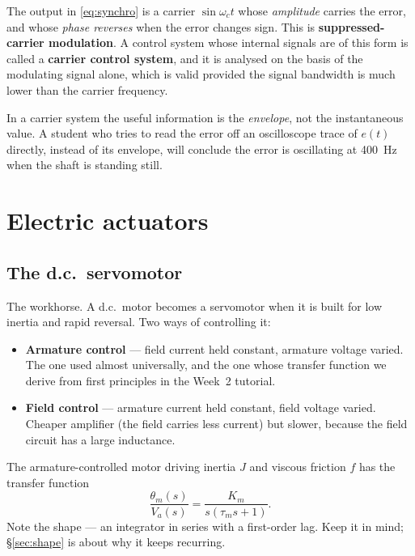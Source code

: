 \documentclass[11pt,a4paper]{article}
\begin{document}
The output in \eqref{eq:synchro} is a carrier $\sin\omega_c t$ whose
\emph{amplitude} carries the error, and whose \emph{phase reverses} when the
error changes sign. This is \textbf{suppressed-carrier modulation}. A control
system whose internal signals are of this form is called a \textbf{carrier
control system}, and it is analysed on the basis of the modulating signal
alone, which is valid provided the signal bandwidth is much lower than the
carrier frequency.

\begin{pitfall}
In a carrier system the useful information is the \emph{envelope}, not the
instantaneous value. A student who tries to read the error off an oscilloscope
trace of $e(t)$ directly, instead of its envelope, will conclude the error is
oscillating at \SI{400}{\hertz} when the shaft is standing still.
\end{pitfall}

\section{Electric actuators}

\subsection{The d.c.\ servomotor}

The workhorse. A d.c.\ motor becomes a servomotor when it is built for low
inertia and rapid reversal. Two ways of controlling it:

\begin{itemize}[leftmargin=*]
\item \textbf{Armature control} --- field current held constant, armature
      voltage varied. The one used almost universally, and the one whose
      transfer function we derive from first principles in the Week~2 tutorial.
\item \textbf{Field control} --- armature current held constant, field voltage
      varied. Cheaper amplifier (the field carries less current) but slower,
      because the field circuit has a large inductance.
\end{itemize}

The armature-controlled motor driving inertia $J$ and viscous friction $f$ has
the transfer function
\begin{equation}
  \frac{\theta_m(s)}{V_a(s)}=\frac{K_m}{s(\tau_m s+1)} .
  \label{eq:dcm}
\end{equation}
Note the shape --- an integrator in series with a first-order lag. Keep it in
mind; \S\ref{sec:shape} is about why it keeps recurring.
\end{document}
